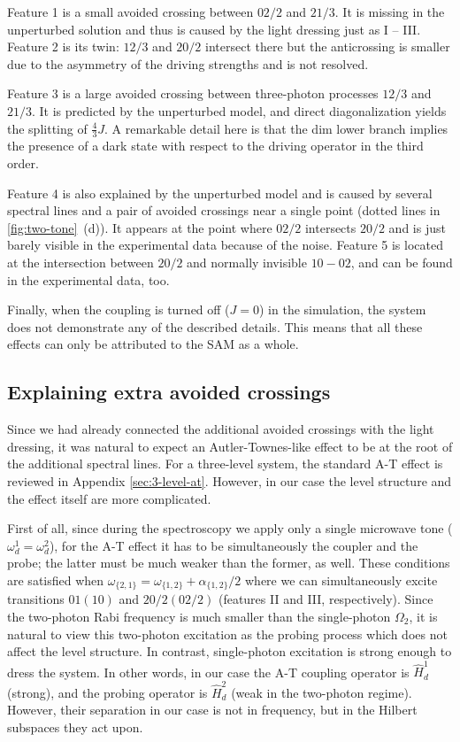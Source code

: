 \documentclass[%
 prx,
 amsmath,amssymb,
 reprint,%
]{revtex4-1}
\begin{document}
Feature 1 is a small avoided crossing between ${02/2}$ and ${21/3}$. It is missing in the unperturbed solution and thus is caused by the light dressing just as I -- III. Feature 2 is its twin: ${12/3}$ and ${20/2}$ intersect there but the anticrossing is smaller due to the asymmetry of the driving strengths and is not resolved. 

Feature 3 is a large avoided crossing between three-photon processes ${12/3}$ and ${21/3}$. It is predicted by the unperturbed model, and direct diagonalization yields the splitting of $\frac{4}{3}J$. A remarkable detail here is that the dim lower branch implies the presence of a dark state with respect to the driving operator in the third order. 

Feature 4 is also explained by the unperturbed model and is caused by several spectral lines and a pair of avoided crossings near a single point (dotted lines in \autoref{fig:two-tone}~(d)). It appears at the point where ${02/2}$ intersects ${20/2}$ and is just barely visible in the experimental data because of the noise. Feature 5 is located at the intersection between ${20/2}$ and normally invisible ${10} - {02}$, and can be found in the experimental data, too. 

Finally, when the coupling is turned off ($J=0$) in the simulation, the system does not demonstrate any of the described details. This means that all these effects can only be attributed to the SAM as a whole. 

\subsection{Explaining extra avoided crossings}\label{sec:theory}

Since we had already connected the additional avoided crossings with the light dressing, it was natural to expect an Autler-Townes-like effect to be at the root of the additional spectral lines. For a three-level system, the standard A-T effect is reviewed in Appendix \ref{sec:3-level-at}. However, in our case the level structure and the effect itself are more complicated. 

First of all, since during the spectroscopy we apply only a single microwave tone ($\omega_d^1 = \omega_d^2$), for the A-T effect it has to be simultaneously the coupler and the probe; the latter must be much weaker than the former, as well. These conditions are satisfied when $\omega_{\{2,1\}} = \omega_{\{1,2\}}+\alpha_{\{1,2\}}/2$  where we can simultaneously excite transitions $01 (10)$ and $20/2 (02/2)$ (features II and III, respectively). Since the two-photon Rabi frequency is much smaller than the single-photon $\Omega_2$, it is natural to view this two-photon excitation as the probing process which does not affect the level structure. In contrast, single-photon excitation is strong enough to dress the system. In other words, in our case the A-T coupling operator is $\hat H_{d}^1$ (strong), and the probing operator is $\hat H_{d}^2$ (weak in the two-photon regime). However, their separation in our case is not in frequency, but in the Hilbert subspaces they act upon.
\end{document}
